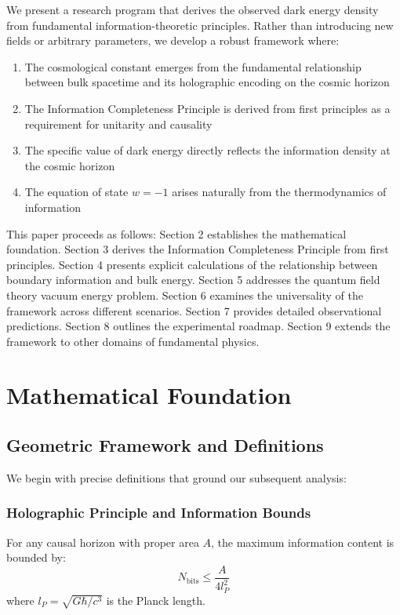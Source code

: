 \documentclass[12pt]{article}
\theoremstyle{plain}
\theoremstyle{definition}
\theoremstyle{remark}
\begin{document}
We present a research program that derives the observed dark energy density from fundamental information-theoretic principles. Rather than introducing new fields or arbitrary parameters, we develop a robust framework where:

\begin{enumerate}
\item The cosmological constant emerges from the fundamental relationship between bulk spacetime and its holographic encoding on the cosmic horizon
\item The Information Completeness Principle is derived from first principles as a requirement for unitarity and causality
\item The specific value of dark energy directly reflects the information density at the cosmic horizon
\item The equation of state $w = -1$ arises naturally from the thermodynamics of information
\end{enumerate}

This paper proceeds as follows: Section 2 establishes the mathematical foundation. Section 3 derives the Information Completeness Principle from first principles. Section 4 presents explicit calculations of the relationship between boundary information and bulk energy. Section 5 addresses the quantum field theory vacuum energy problem. Section 6 examines the universality of the framework across different scenarios. Section 7 provides detailed observational predictions. Section 8 outlines the experimental roadmap. Section 9 extends the framework to other domains of fundamental physics.

\section{Mathematical Foundation}

\subsection{Geometric Framework and Definitions}

We begin with precise definitions that ground our subsequent analysis:

\subsubsection{Holographic Principle and Information Bounds}

For any causal horizon with proper area $A$, the maximum information content is bounded by:
\[
N_{\text{bits}} \leq \frac{A}{4l_P^2}
\]
where $l_P = \sqrt{G\hbar/c^3}$ is the Planck length.
\end{document}
